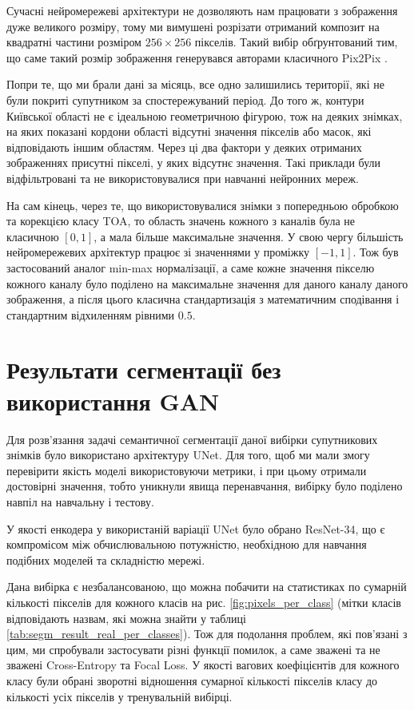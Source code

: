 Сучасні нейромережеві архітектури не дозволяють нам працювати
з зображення дуже великого розміру, тому ми вимушені
розрізати отриманий композит на квадратні частини розміром $256 \times 256$
пікселів. Такий вибір обґрунтований тим, що саме такий розмір
зображення генерувався авторами класичного Pix2Pix  \cite{pix2pix}.

Попри те, що ми брали дані за місяць, все одно залишились
території, які не були покриті супутником за спостережуваний період.
До того ж, контури Київської області не є ідеальною геометричною фігурою,
тож на деяких знімках, на яких показані кордони області відсутні значення
пікселів або масок, які відповідають іншим областям.
Через ці два фактори у деяких отриманих зображеннях
присутні пікселі, у яких відсутнє значення.
Такі приклади були відфільтровані та не
використовувалися при навчанні нейронних мереж.

На сам кінець, через те, що використовувалися знімки з
попередньою обробкою та корекцією класу TOA, то
область значень кожного з каналів була не класичною
$[0, 1]$, а мала більше максимальне значення.
У свою чергу більшість нейромережевих архітектур працює зі
значеннями у проміжку $[-1, 1]$.
Тож був застосований аналог min-max нормалізації, а саме
кожне значення пікселю кожного каналу було поділено на
максимальне значення для даного каналу даного зображення,
а після цього класична стандартизація з математичним
сподівання і стандартним відхиленням рівними $0.5$.

\section{Результати сегментації без використання GAN}

Для розв'язання задачі семантичної сегментації
даної вибірки супутникових знімків було використано
архітектуру UNet. Для того, щоб ми мали змогу перевірити
якість моделі використовуючи метрики, і при цьому
отримали достовірні значення, тобто уникнули явища
перенавчання, вибірку було поділено навпіл на навчальну і тестову.

У якості енкодера у використаній варіації UNet було обрано
ResNet-34, що є компромісом між обчислювальною потужністю,
необхідною для навчання подібних моделей та
складністю мережі.

Дана вибірка є незбалансованою, що можна побачити на
статистиках по сумарній кількості пікселів
для кожного класів на рис. \ref{fig:pixels_per_class}
(мітки класів відповідають назвам, які можна знайти
у таблиці \ref{tab:segm_result_real_per_classes}).
Тож для подолання проблем, які пов'язані з цим, ми спробували
застосувати різні функції помилок, а саме зважені та
не зважені Cross-Entropy
та Focal Loss. У якості вагових коефіцієнтів для кожного
класу були обрані зворотні відношення сумарної кількості пікселів класу
до кількості усіх пікселів у тренувальній вибірці.

